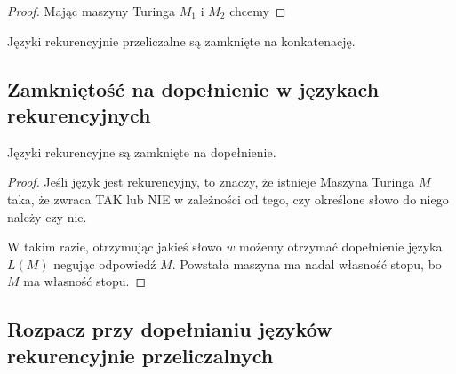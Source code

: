 \begin{proof}
    Mając maszyny Turinga \(M_1\) i \(M_2\) chcemy 
\end{proof}

\begin{theorem}
    Języki rekurencyjnie przeliczalne są zamknięte na konkatenację.
\end{theorem}

\subsection{Zamkniętość na dopełnienie w językach rekurencyjnych}

\begin{theorem}
    \label{recursive-languages-closed-under-complement}
    Języki rekurencyjne są zamknięte na dopełnienie.
\end{theorem}
\begin{proof}
    Jeśli język jest rekurencyjny, to znaczy, że istnieje Maszyna Turinga \(M\) taka, że zwraca \textsc{TAK} lub \textsc{NIE} w zależności od tego, czy określone słowo do niego należy czy nie.
    
    W takim razie, otrzymując jakieś słowo \(w\) możemy otrzymać dopełnienie języka \(L(M)\) negując odpowiedź \(M\). Powstała maszyna ma nadal własność stopu, bo \(M\) ma własność stopu. 
\end{proof}

\subsection{Rozpacz przy dopełnianiu języków rekurencyjnie przeliczalnych}

